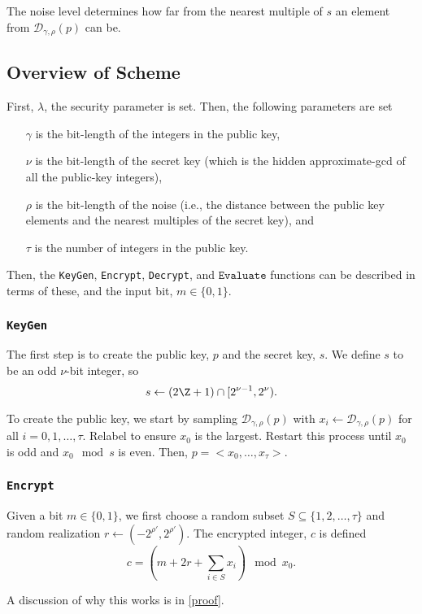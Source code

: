 \documentclass[a4paper,11pt, oneside]{article}
\renewcommand{\D}{\mathcal{D}_{\gamma,\rho}(p)}
\begin{document}
The noise level determines how far from the nearest multiple of $s$ an element from $\D$ can be.

    \subsection{Overview of Scheme}
    First, $\lambda$, the security parameter is set.  Then, the following parameters are set
\begin{itemize}
    \item[$\gamma$] is the bit-length of the integers in the public key, 
    \item[$\nu$] is the bit-length of the secret key (which is the hidden approximate-gcd of all the public-key integers), 
    \item[$\rho$] is the bit-length of the noise (i.e., the distance between the public key elements and the nearest multiples of the secret key), and 
    \item[$\tau$] is the number of integers in the public key.
\end{itemize}

Then, the \texttt{KeyGen}, \texttt{Encrypt}, \texttt{Decrypt}, and $\texttt{Evaluate}$ functions can be described in terms of these, and the input bit, $m\in\{0,1\}$.

\subsubsection{\texttt{KeyGen}}
The first step is to create the public key, $p$ and the secret key, $s$.  We define $s$ to be an odd $\nu$-bit integer, so
\[ s\leftarrow (2\Z + 1)\cap [2^{\nu - 1}, 2^\nu).\]


To create the public key, we start by sampling $\D$ with $x_i \leftarrow \D$ for all $i=0,1,\dots,\tau$.  Relabel to ensure $x_0$ is the largest.  Restart this process until $x_0$ is odd and $x_0\mod{s}$ is even.  Then, $p = <x_0,\dots,x_\tau>$.
    
\subsubsection{\texttt{Encrypt}}

Given a bit $m\in\{0,1\}$, we first choose a random subset $S\subseteq \{1,2,\dots,\tau\}$ and random realization $r\leftarrow (-2^{\rho'},2^{\rho'})$.  The encrypted integer, $c$ is defined
\[c = \left( m+2r + \sum_{i\in S}x_i \right)\mod{x_0}.\]

A discussion of why this works is in \ref{proof}.
\end{document}
